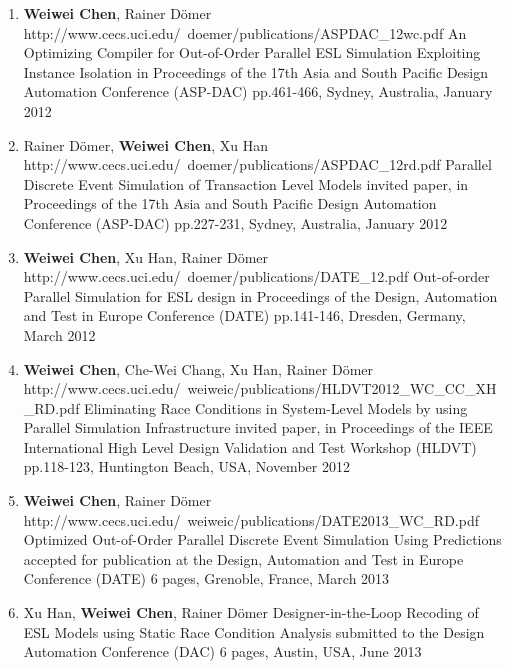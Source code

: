 \begin{enumerate}
\item
	\mypubhl
	{\textbf{Weiwei Chen}, Rainer D\"{o}mer}
	{http://www.cecs.uci.edu/~doemer/publications/ASPDAC_12wc.pdf}
	{An Optimizing Compiler for Out-of-Order Parallel ESL Simulation Exploiting Instance Isolation}
	{in Proceedings of }
	{the 17th Asia and South Pacific Design Automation Conference (ASP-DAC)}
	{pp.461-466, Sydney, Australia, January 2012}
	
	
\item
	\mypubhl
	{Rainer D\"{o}mer, \textbf{Weiwei Chen}, Xu Han}
	{http://www.cecs.uci.edu/~doemer/publications/ASPDAC_12rd.pdf}
	{Parallel Discrete Event Simulation of Transaction Level Models}
	{invited paper, in Proceedings of }
	{the 17th Asia and South Pacific Design Automation Conference (ASP-DAC)}
	{pp.227-231, Sydney, Australia, January 2012}
	
	
\item
	\mypubhl
	{\textbf{Weiwei Chen}, Xu Han, Rainer D\"{o}mer}
	{http://www.cecs.uci.edu/~doemer/publications/DATE_12.pdf}
	{Out-of-order Parallel Simulation for ESL design}
	{in Proceedings of }
	{the Design, Automation and Test in Europe Conference (DATE)}
	{pp.141-146, Dresden, Germany, March 2012}
	
\item
	\mypubhl
	{\textbf{Weiwei Chen}, Che-Wei Chang, Xu Han, Rainer D\"{o}mer}
	{http://www.cecs.uci.edu/~weiweic/publications/HLDVT2012_WC_CC_XH_RD.pdf}
	{Eliminating Race Conditions in System-Level Models by using Parallel Simulation Infrastructure} 
	{invited paper, in Proceedings of }
	{the IEEE International High Level Design Validation and Test Workshop (HLDVT)}
	{pp.118-123, Huntington Beach, USA, November 2012}
	
	
\item
	\mypubhl
	{\textbf{Weiwei Chen}, Rainer D\"{o}mer} 
	{http://www.cecs.uci.edu/~weiweic/publications/DATE2013_WC_RD.pdf}
	{Optimized Out-of-Order Parallel Discrete Event Simulation Using Predictions}
	{accepted for publication at }
	{the Design, Automation and Test in Europe Conference  (DATE)}
	{6 pages, Grenoble, France, March 2013}
	
	
\item
	\mypub
	{Xu Han, \textbf{Weiwei Chen}, Rainer D\"{o}mer}
	{Designer-in-the-Loop Recoding of ESL Models using Static Race Condition Analysis}
	{submitted to }
	{the Design Automation Conference (DAC)}
	{6 pages, Austin, USA, June 2013}
\end{enumerate}



